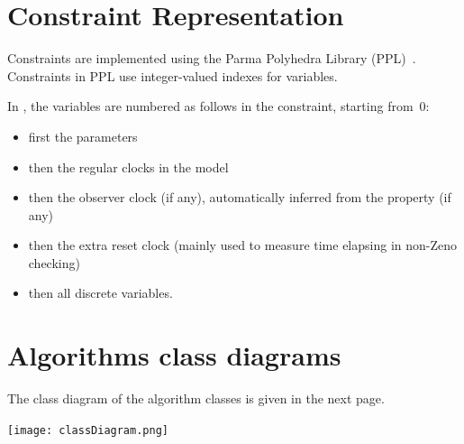 \chapter{Constraint Representation}

Constraints are implemented using the Parma Polyhedra Library (PPL)~\cite{bhz08}.
Constraints in PPL use integer-valued indexes for variables.

In \imitator{}, the variables are numbered as follows in the constraint, starting from~0:
\begin{itemize}
	\item first the parameters
	\item then the regular clocks in the model
	\item then the observer clock (if any), automatically inferred from the property (if any)
	\item then the extra reset clock (mainly used to measure time elapsing in non-Zeno checking)
	\item then all discrete variables.
\end{itemize}




\chapter{Algorithms class diagrams}

The class diagram of the algorithm classes is given in the next page.

\newenvironment{changemargin}[2]{%
\begin{list}{}{%
\setlength{\topsep}{0pt}%
\setlength{\leftmargin}{#1}%
\setlength{\rightmargin}{#2}%
\setlength{\listparindent}{\parindent}%
\setlength{\itemindent}{\parindent}%
\setlength{\parsep}{\parskip}%
}%
\item[]}{\end{list}}

\newpage
\begin{landscape}
\begin{changemargin}{-2.5cm}{-3cm}
\thispagestyle{empty}
\texttt{[image: classDiagram.png]}
\end{changemargin}
\end{landscape}
\newpage


